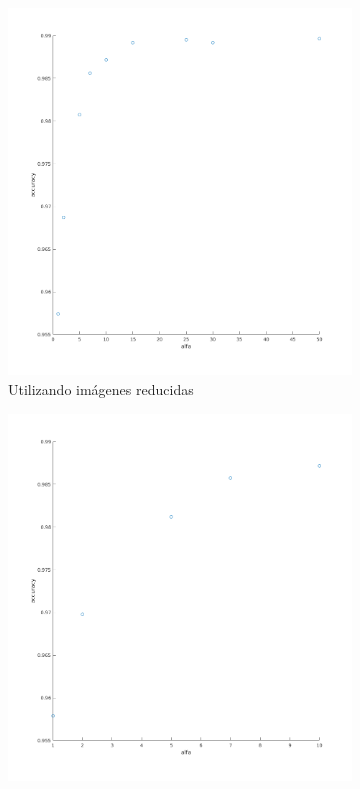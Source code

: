 


\begin{figure}[H]
\begin{subfigure}[h]{0.62\linewidth}
\includegraphics[width=\linewidth]{img/alfa_pca_accu.png}
\caption{Utilizando imágenes reducidas}
\end{subfigure}
\hfill
\begin{subfigure}[h]{0.62\linewidth}
\includegraphics[width=\linewidth]{img/big_alfa_pca_accu.png}

\end{subfigure}
\end{figure}
